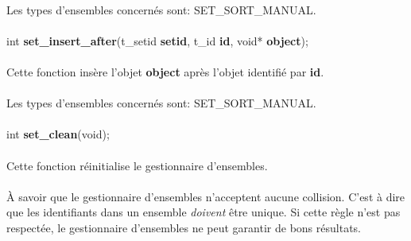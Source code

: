 \documentclass[10pt,a4wide]{article}
\begin{document}
\paragraph{}

Les types d'ensembles concern\'es sont: SET\_SORT\_MANUAL.

\paragraph{}

\hspace{1.5cm}int \textbf{set\_insert\_after}(t\_setid \textbf{setid},
                                              t\_id \textbf{id},
                                              void* \textbf{object});

\paragraph{}

Cette fonction ins\`ere l'objet \textbf{object} apr\`es l'objet identifi\'e
par \textbf{id}.

\paragraph{}

Les types d'ensembles concern\'es sont: SET\_SORT\_MANUAL.

\paragraph{}

\hspace{1.5cm}int \textbf{set\_clean}(void);

\paragraph{}

Cette fonction r\'einitialise le gestionnaire d'ensembles.

\paragraph{}

\`A savoir que le gestionnaire d'ensembles n'acceptent aucune collision.
C'est \`a dire que les identifiants dans un ensemble \textit{doivent}
\^etre unique. Si cette r\`egle n'est pas respect\'ee, le gestionnaire
d'ensembles ne peut garantir de bons r\'esultats.
\end{document}
